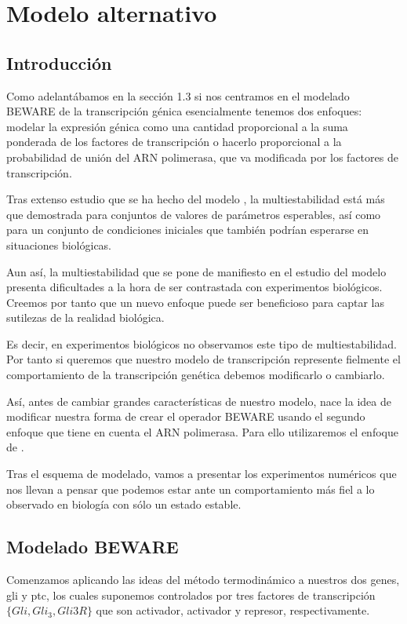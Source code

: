\chapter{Modelo alternativo}

\label{ch:modelo_alternativo}

\section{Introducción}

Como adelantábamos en la sección 1.3 si nos centramos en el modelado BEWARE de la transcripción génica esencialmente tenemos dos enfoques: modelar la expresión génica como una cantidad proporcional a la suma ponderada de los factores de transcripción o hacerlo proporcional a la probabilidad de unión del ARN polimerasa, que va modificada por los factores de transcripción.

Tras extenso estudio que se ha hecho del modelo \cite{schaffer}, la multiestabilidad está más que demostrada para conjuntos de valores de parámetros esperables, así como para un conjunto de condiciones iniciales que también podrían esperarse en situaciones biológicas. 

Aun así, la multiestabilidad que se pone de manifiesto en el estudio del modelo presenta dificultades a la hora de ser contrastada con experimentos biológicos. Creemos por tanto que un nuevo enfoque puede ser beneficioso para captar las sutilezas de la realidad biológica.

Es decir, en experimentos biológicos no observamos este tipo de multiestabilidad. Por tanto si queremos que nuestro modelo de transcripción represente fielmente el comportamiento de la transcripción genética debemos modificarlo o cambiarlo.

Así, antes de cambiar grandes características de nuestro modelo, nace la idea de modificar nuestra forma de crear el operador BEWARE usando el segundo enfoque que tiene en cuenta el ARN polimerasa. Para ello utilizaremos el enfoque de \cite{cambon1}.

Tras el esquema de modelado, vamos a presentar los experimentos numéricos que nos llevan a pensar que podemos estar ante un comportamiento más fiel a lo observado en biología con sólo un estado estable. 

\section{Modelado BEWARE}
Comenzamos aplicando las ideas del método termodinámico a nuestros dos genes, gli y ptc, los cuales suponemos controlados por tres factores de transcripción $\{Gli, Gli_3, Gli3R\} $ que son activador, activador y represor, respectivamente.

